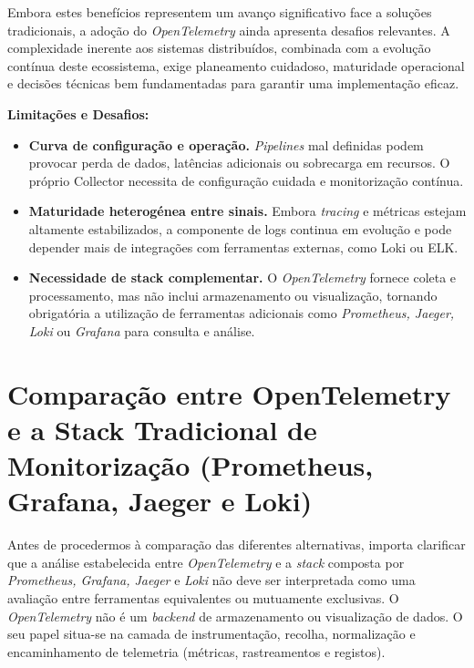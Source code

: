 Embora estes benefícios representem um avanço significativo face a soluções tradicionais, a adoção do \textit{OpenTelemetry} ainda apresenta desafios relevantes. A complexidade inerente aos sistemas distribuídos, combinada com a evolução contínua deste ecossistema, exige planeamento cuidadoso, maturidade operacional e decisões técnicas bem fundamentadas para garantir uma implementação eficaz.


\textbf{Limitações e Desafios:}

\begin{itemize}
    \item \textbf{Curva de configuração e operação.} \textit{Pipelines} mal definidas podem provocar perda de dados, latências adicionais ou sobrecarga em recursos. O próprio Collector necessita de configuração cuidada e monitorização contínua.
    
    \item \textbf{Maturidade heterogénea entre sinais.} Embora \textit{tracing} e métricas estejam altamente estabilizados, a componente de logs continua em evolução e pode depender mais de integrações com ferramentas externas, como Loki ou ELK.
    
    \item \textbf{Necessidade de stack complementar.} O \textit{OpenTelemetry} fornece coleta e processamento, mas não inclui armazenamento ou visualização, tornando obrigatória a utilização de ferramentas adicionais como \textit{ Prometheus, Jaeger, Loki} ou \textit{ Grafana} para consulta e análise.
\end{itemize}

\break


\section{Comparação entre OpenTelemetry e a Stack Tradicional de Monitorização (Prometheus, Grafana, Jaeger e Loki)}


Antes de procedermos à comparação das diferentes alternativas, importa clarificar que a análise estabelecida entre \textit{OpenTelemetry} e a \textit{stack} composta por \textit{ Prometheus, Grafana, Jaeger} e \textit{ Loki} não deve ser interpretada como uma avaliação entre ferramentas equivalentes ou mutuamente exclusivas. O \textit{OpenTelemetry} não é um \textit{backend} de armazenamento ou visualização de dados. O seu papel situa-se na camada de instrumentação, recolha, normalização e encaminhamento de telemetria (métricas, rastreamentos e registos).


